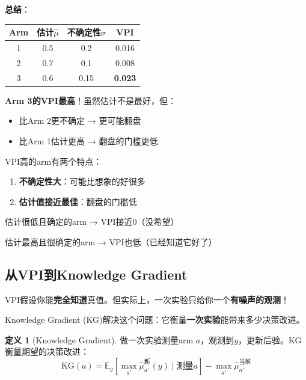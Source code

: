 \documentclass[11pt,a4paper]{article}
\theoremstyle{definition}
\newtheorem{definition}{定义}[section]
\begin{document}
\textbf{总结}：

\begin{center}
\begin{tabular}{c|c|c|c}
\toprule
Arm & 估计$\hat{\mu}$ & 不确定性$\sigma$ & VPI \\
\midrule
1 & 0.5 & 0.2 & 0.016 \\
2 & 0.7 & 0.1 & 0.008 \\
3 & 0.6 & 0.15 & \textbf{0.023} \\
\bottomrule
\end{tabular}
\end{center}

\textbf{Arm 3的VPI最高}！虽然估计不是最好，但：
\begin{itemize}
    \item 比Arm 2更不确定 → 更可能翻盘
    \item 比Arm 1估计更高 → 翻盘的门槛更低
\end{itemize}

\begin{keypoint}[VPI的直觉]
VPI高的arm有两个特点：
\begin{enumerate}
    \item \textbf{不确定性大}：可能比想象的好很多
    \item \textbf{估计值接近最佳}：翻盘的门槛低
\end{enumerate}

估计很低且确定的arm → VPI接近0（没希望）

估计最高且很确定的arm → VPI也低（已经知道它好了）
\end{keypoint}

\subsection{从VPI到Knowledge Gradient}

\begin{plainwords}[VPI的问题]
VPI假设你能\textbf{完全知道}真值。但实际上，一次实验只给你一个\textbf{有噪声的观测}！

Knowledge Gradient (KG)解决这个问题：它衡量\textbf{一次实验}能带来多少决策改进。
\end{plainwords}

\begin{definition}[Knowledge Gradient]
做一次实验测量arm $a$，观测到$y$，更新后验。KG衡量期望的决策改进：
\[
\text{KG}(a) = \mathbb{E}_y\left[\max_{a'} \hat{\mu}_{a'}^{\text{新}}(y) \mid \text{测量}a\right] - \max_{a'} \hat{\mu}_{a'}^{\text{当前}}
\]
\end{definition}
\end{document}
